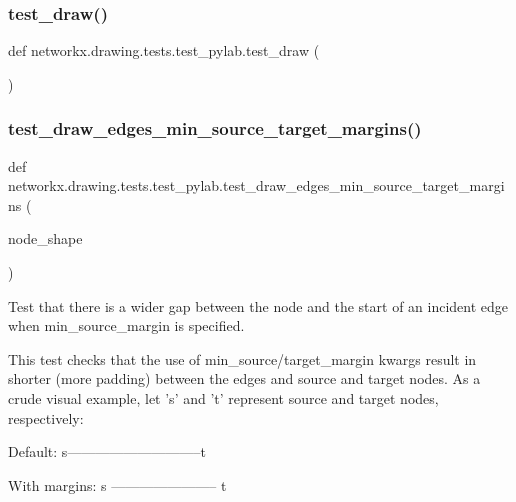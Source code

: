 \subsubsection{\texorpdfstring{test\+\_\+draw()}{test\_draw()}}
{\footnotesize\ttfamily def networkx.\+drawing.\+tests.\+test\+\_\+pylab.\+test\+\_\+draw (\begin{DoxyParamCaption}{ }\end{DoxyParamCaption})}

\mbox{\label{namespacenetworkx_1_1drawing_1_1tests_1_1test__pylab_a62582932ed7a0e29f64b40363780375e}} 
\subsubsection{\texorpdfstring{test\+\_\+draw\+\_\+edges\+\_\+min\+\_\+source\+\_\+target\+\_\+margins()}{test\_draw\_edges\_min\_source\_target\_margins()}}
{\footnotesize\ttfamily def networkx.\+drawing.\+tests.\+test\+\_\+pylab.\+test\+\_\+draw\+\_\+edges\+\_\+min\+\_\+source\+\_\+target\+\_\+margins (\begin{DoxyParamCaption}\item[{}]{node\+\_\+shape }\end{DoxyParamCaption})}

\begin{DoxyVerb}Test that there is a wider gap between the node and the start of an
incident edge when min_source_margin is specified.

This test checks that the use of min_{source/target}_margin kwargs result
in shorter (more padding) between the edges and source and target nodes.
As a crude visual example, let 's' and 't' represent source and target
nodes, respectively:

   Default:
   s-----------------------------t

   With margins:
   s   -----------------------   t\end{DoxyVerb}
 \mbox{\label{namespacenetworkx_1_1drawing_1_1tests_1_1test__pylab_a46987cf8f6ddb24537ba1614734c0a61}} 
